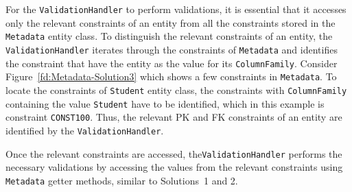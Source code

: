 For the \texttt{ValidationHandler} to perform validations, it is essential that
it accesses only the relevant constraints of an entity from all the constraints
stored in the \texttt{Metadata} entity class. To distinguish the relevant
constraints of an entity, the \texttt{ValidationHandler} iterates through the
constraints of \texttt{Metadata} and identifies the constraint that have the
entity as the value for its \texttt{ColumnFamily}.
Consider Figure~\ref{fd:Metadata-Solution3} which shows a few constraints in
\texttt{Metadata}. To locate the constraints of \texttt{Student} entity class,
the constraints with \texttt{ColumnFamily} containing the value
\texttt{Student} have to be identified, which in this example is constraint
\texttt{CONST100}.
Thus, the relevant \ac{PK} and \ac{FK} constraints of an entity are identified
by the \texttt{ValidationHandler}.

 Once the relevant constraints are
accessed,  the\texttt{ValidationHandler} performs
the necessary validations by accessing the values from the relevant
constraints using \texttt{Metadata} getter methods, similar to Solutions~1 and
2.


